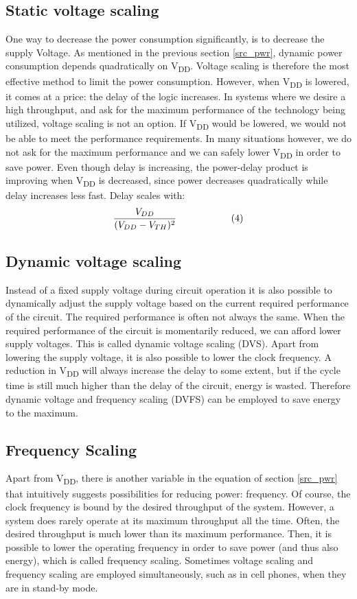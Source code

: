  \subsection{Static voltage scaling}
 One way to decrease the power consumption significantly, is to decrease the supply 
 Voltage. As mentioned in the previous section \ref{src_pwr},  dynamic power consumption depends quadratically 
 on V\textsubscript{DD}. Voltage scaling is therefore the most effective method to limit the power 
 consumption. However, when V\textsubscript{DD} is lowered, it comes at a price: the delay of the logic 
 increases. In systems where we desire a high throughput, and ask for the maximum 
 performance of the technology being utilized, voltage scaling is not an option. If V\textsubscript{DD} 
 would be lowered, we would not be able to meet the performance requirements. In many 
 situations however, we do not ask for the maximum performance and we can safely lower 
V\textsubscript{DD} in order to save power. Even though delay is increasing, the power-delay product 
 is improving when V\textsubscript{DD} is decreased, since power decreases quadratically while delay 
 increases less fast. Delay scales with:
 \[ \frac{V_{DD}}{
 	(V_{DD} - V_{TH})^2
 	} \hspace{20mm}(4)\]     
 
 \subsection{Dynamic voltage scaling}
 Instead of a fixed supply voltage during circuit operation it is also possible to dynamically 
 adjust the supply voltage based on the current required performance of the circuit. The 
 required performance is often not always the same. When the required performance 
 of the circuit is momentarily reduced, we can afford lower supply voltages. This is 
 called dynamic voltage scaling (DVS). Apart from lowering the supply 
 voltage, it is also possible to lower the clock frequency. A reduction in V\textsubscript{DD} will always 
 increase the delay to some extent, but if the cycle time is still much higher than the delay 
 of the circuit, energy is wasted. Therefore dynamic voltage and frequency scaling 
 (DVFS) can be employed to save energy to the maximum.
 
 \subsection{Frequency Scaling}
 Apart from V\textsubscript{DD}, there is another variable in the equation of section \ref{src_pwr} that intuitively 
 suggests possibilities for reducing power: frequency. Of course, the clock frequency is 
 bound by the desired throughput of the system. However, a system does rarely operate at 
 its maximum throughput all the time. Often, the desired throughput is much lower than 
 its maximum performance. Then, it is possible to lower the operating frequency in order 
 to save power (and thus also energy), which is called frequency scaling. Sometimes 
 voltage scaling and frequency scaling are employed simultaneously, such as in cell phones, 
 when they are in stand-by mode.
 
